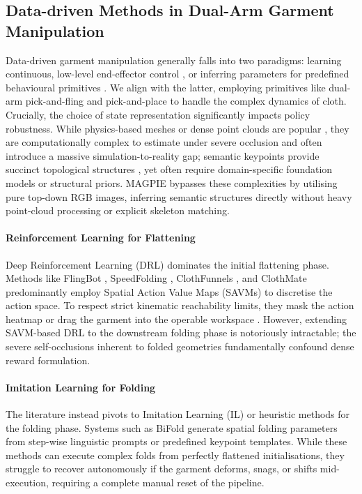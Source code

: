 \documentclass[journal]{IEEEtran}
\begin{document}
\subsection{Data-driven Methods in Dual-Arm Garment Manipulation}
\label{sec:dual_arm_shaping}

Data-driven garment manipulation generally falls into two paradigms: learning continuous, low-level end-effector control \cite{black2024pi0, chi2025diffusion}, or inferring parameters for predefined behavioural primitives \cite{ha2022flingbot, avigal2022speedfolding}. We align with the latter, employing primitives like dual-arm pick-and-fling and pick-and-place to handle the complex dynamics of cloth. Crucially, the choice of state representation significantly impacts policy robustness. While physics-based meshes or dense point clouds are popular \cite{wu2024unigarmentmanip}, they are computationally complex to estimate under severe occlusion and often introduce a massive simulation-to-reality gap; semantic keypoints provide succinct topological structures \cite{deng2025clasp}, yet often require domain-specific foundation models or structural priors. MAGPIE bypasses these complexities by utilising pure top-down RGB images, inferring semantic structures directly without heavy point-cloud processing or explicit skeleton matching.

\paragraph{Reinforcement Learning for Flattening} Deep Reinforcement Learning (DRL) dominates the initial flattening phase. Methods like FlingBot \cite{ha2022flingbot}, SpeedFolding \cite{avigal2022speedfolding}, ClothFunnels \cite{canberk2022cloth}, and ClothMate \cite{luo2025clothmate} predominantly employ Spatial Action Value Maps (SAVMs) \cite{lee2021learning} to discretise the action space. To respect strict kinematic reachability limits, they mask the action heatmap or drag the garment into the operable workspace \cite{xue2023unifolding}. However, extending SAVM-based DRL to the downstream folding phase is notoriously intractable; the severe self-occlusions inherent to folded geometries fundamentally confound dense reward formulation.

\paragraph{Imitation Learning for Folding} The literature instead pivots to Imitation Learning (IL) \cite{kadi2025draper} or heuristic methods \cite{canberk2022cloth} for the folding phase. Systems such as BiFold \cite{barbany2025bifold} generate spatial folding parameters from step-wise linguistic prompts or predefined keypoint templates. While these methods can execute complex folds from perfectly flattened initialisations, they struggle to recover autonomously if the garment deforms, snags, or shifts mid-execution, requiring a complete manual reset of the pipeline.
\end{document}
